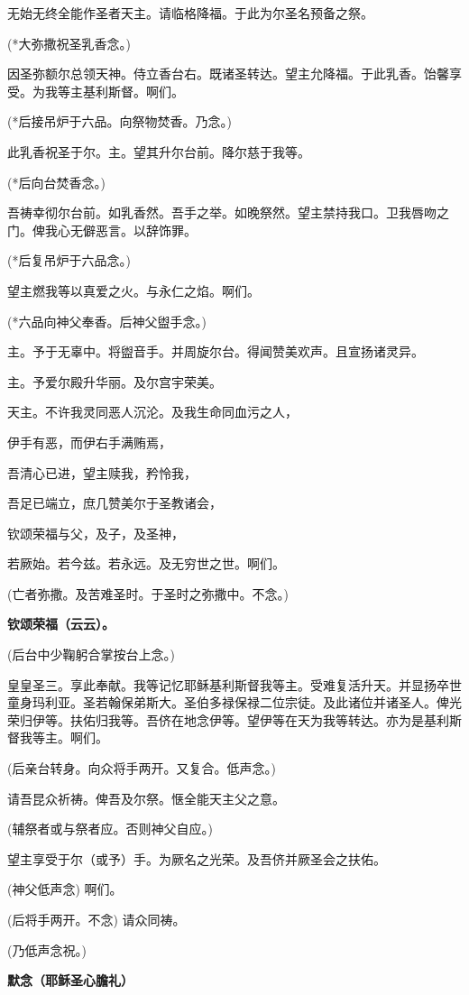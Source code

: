 \documentclass[UTF8,17pt]{ctexart}
\begin{document}
⽆始⽆终全能作圣者天主。请临格降福。于此为尔圣名预备之祭。

(*⼤弥撒祝圣乳⾹念。)

因圣弥额尔总领天神。侍⽴⾹台右。既诸圣转达。望主允降福。于此乳⾹。饴馨享受。为我等主基利斯督。啊们。

(*后接吊炉于六品。向祭物焚⾹。乃念。)

此乳⾹祝圣于尔。主。望其升尔台前。降尔慈于我等。

(*后向台焚⾹念。)

吾祷幸彻尔台前。如乳⾹然。吾⼿之举。如晚祭然。望主禁持我口。卫我唇吻之门。俾我⼼⽆僻恶⾔。以辞饰罪。

(*后复吊炉于六品念。)

望主燃我等以真爱之⽕。与永仁之焰。啊们。

(*六品向神⽗奉⾹。后神⽗盥⼿念。)

主。予于⽆辜中。将盥⾳⼿。并周旋尔台。得闻赞美欢声。且宣扬诸灵异。

主。予爱尔殿升华丽。及尔宫宇荣美。

天主。不许我灵同恶⼈沉沦。及我⽣命同⾎污之⼈，

伊⼿有恶，⽽伊右⼿满贿焉，

吾清⼼已进，望主赎我，矜怜我，

吾⾜已端⽴，庶⼏赞美尔于圣教诸会，

钦颂荣福与⽗，及⼦，及圣神，

若厥始。若今兹。若永远。及⽆穷世之世。啊们。

(亡者弥撒。及苦难圣时。于圣时之弥撒中。不念。)

\textbf{钦颂荣福（云云）。}

(后台中少鞠躬合掌按台上念。)

皇皇圣三。享此奉献。我等记忆耶稣基利斯督我等主。受难复活升天。并显扬卒世童⾝玛利亚。圣若翰保弟斯⼤。圣伯多禄保禄⼆位宗徒。及此诸位并诸圣⼈。俾光荣归伊等。扶佑归我等。吾侪在地念伊等。望伊等在天为我等转达。亦为是基利斯督我等主。啊们。

(后亲台转⾝。向众将⼿两开。又复合。低声念。)

请吾昆众祈祷。俾吾及尔祭。惬全能天主⽗之意。

(辅祭者或与祭者应。否则神⽗⾃应。)

望主享受于尔（或予）⼿。为厥名之光荣。及吾侪并厥圣会之扶佑。

(神⽗低声念) \quad 啊们。

(后将⼿两开。不念) \quad 请众同祷。

(乃低声念祝。)

\textbf{默念（耶稣圣⼼膽礼）}
\end{document}
